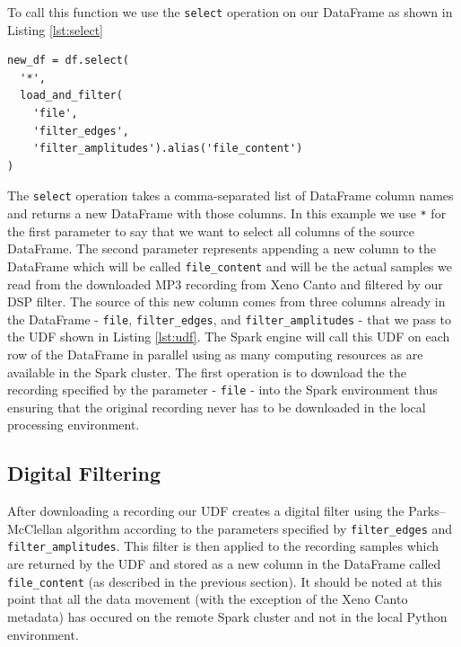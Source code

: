 \documentclass[conference,twoside]{IEEEtran}
\newcommand{\code}[1]{\texttt{#1}}
\begin{document}
To call this function we use the \code{select} operation on our DataFrame as shown in Listing \ref{lst:select}
\begin{lstlisting}[language=Txt, caption={PySpark DataFrame Select()}, label={lst:select}]
new_df = df.select(
  '*',
  load_and_filter(
    'file',
    'filter_edges',
    'filter_amplitudes').alias('file_content')
)
\end{lstlisting}
The \code{select} operation takes a comma-separated list of DataFrame column names and returns a new DataFrame with those columns. In this example we use \code{*} for the first parameter to say that we want to select all columns of the source DataFrame. The second parameter represents appending a new column to the DataFrame which will be called \code{file\_content} and will be the actual samples we read from the downloaded MP3 recording from Xeno Canto and filtered by our DSP filter. The source of this new column comes from three columns already in the DataFrame - \code{file}, \code{filter\_edges}, and \code{filter\_amplitudes} - that we pass to the UDF shown in Listing \ref{lst:udf}. The Spark engine will call this UDF on each row of the DataFrame in parallel using as many computing resources as are available in the Spark cluster. The first operation is to download the the recording specified by the parameter - \code{file} - into the Spark environment thus ensuring that the original recording never has to be downloaded in the local processing environment.

\subsection{Digital Filtering}
After downloading a recording our UDF creates a digital filter using the Parks–McClellan algorithm\cite{dsp} according to the parameters specified by \code{filter\_edges} and \code{filter\_amplitudes}. This filter is then applied to the recording samples which are returned by the UDF and stored as a new column in the DataFrame called \code{file\_content} (as described in the previous section). It should be noted at this point that all the data movement (with the exception of the Xeno Canto metadata) has occured on the remote Spark cluster and not in the local Python environment.
\end{document}
